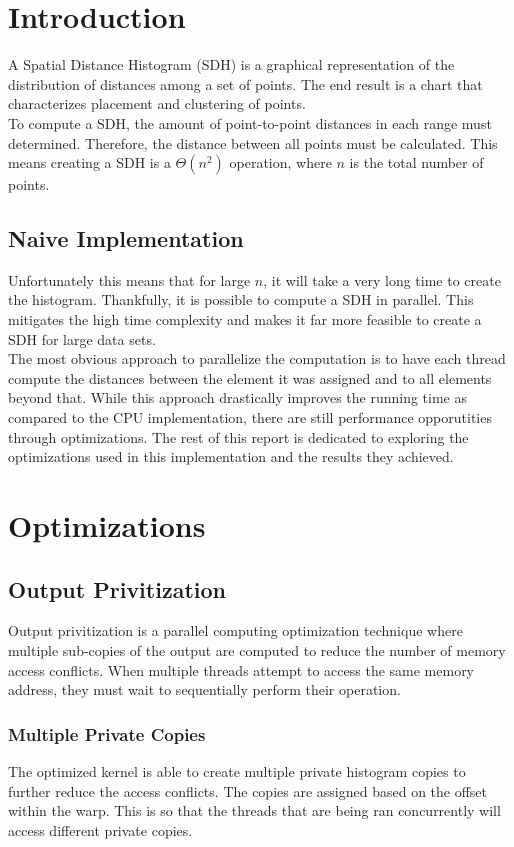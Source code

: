 \begin{multicols}{2}
	\section{Introduction}
	A Spatial Distance Histogram (SDH) is a graphical representation of the distribution of distances among a set of points. The end result is a chart that characterizes placement and clustering of points.\\
	To compute a SDH, the amount of point-to-point distances in each range must determined. Therefore, the distance between all points must be calculated. This means creating a SDH is a $\Theta(n^2)$ operation, where $n$ is the total number of points.
	\subsection{Naive Implementation}
	Unfortunately this means that for large $n$, it will take a very long time to create the histogram. Thankfully, it is possible to compute a SDH in parallel. This mitigates the high time complexity and makes it far more feasible to create a SDH for large data sets.\\
	The most obvious approach to parallelize the computation is to have each thread compute the distances between the element it was assigned and to all elements beyond that. While this approach drastically improves the running time as compared to the CPU implementation, there are still performance opporutities through optimizations. The rest of this report is dedicated to exploring the optimizations used in this implementation and the results they achieved.%

	\section{Optimizations}
	\subsection{Output Privitization}
	Output privitization is a parallel computing optimization technique where multiple sub-copies of the output are computed to reduce the number of memory access conflicts. When multiple threads attempt to access the same memory address, they must wait to sequentially perform their operation.
	\subsubsection{Multiple Private Copies}
	The optimized kernel is able to create multiple private histogram copies to further reduce the access conflicts. The copies are assigned based on the offset within the warp. This is so that the threads that are being ran concurrently will access different private copies.

\end{multicols}
